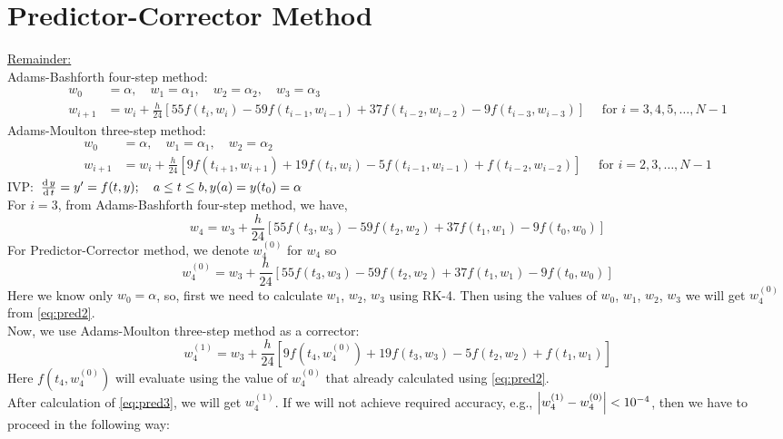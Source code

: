 \documentclass[../main-sheet.tex]{subfiles}
\begin{document}
\section{Predictor-Corrector Method}
\underline{Remainder:}\\
Adams-Bashforth four-step method:
\begin{align*}
    w_0&=\alpha, \quad w_1=\alpha_1,\quad w_2=\alpha_2,\quad w_3=\alpha_3\\
    w_{i+1}&=w_i+\frac{h}{24}\left[ 55f(t_i,w_i)-59f(t_{i-1},w_{i-1})+37f(t_{i-2},w_{i-2})-9f(t_{i-3},w_{i-3}) \right]\quad\text{ for } i=3,4,5,\dots, N-1
\end{align*}
Adams-Moulton three-step method:
\begin{align*}
    w_0&=\alpha, \quad w_1=\alpha_1,\quad w_2=\alpha_2\\
    w_{i+1}&=w_i+\frac{h}{24}\left[ 9f(t_{i+1},w_{i+1})+19f(t_{i},w_{i})-5f(t_{i-1},w_{i-1})+f(t_{i-2},w_{i-2}) \right]\quad\text{ for } i=2,3,\dots, N-1
\end{align*}
IVP: \(\,\frac{\mathrm{d}\,y}{\mathrm{d}\,t}=y'=f(t,y);\quad a\leq t\leq b, y(a)=y(t_0)=\alpha\)\\
For \(i=3\), from Adams-Bashforth four-step method, we have,
\begin{equation}
    w_{4}=w_3+\frac{h}{24}\left[ 55f(t_3,w_3)-59f(t_{2},w_{2})+37f(t_{1},w_{1})-9f(t_{0},w_{0}) \right]\label{eq:pred1}
\end{equation}
For Predictor-Corrector method, we denote \(w_4^{(0)}\) for \(w_4\) so 
\begin{equation}
    w_{4}^{(0)}=w_3+\frac{h}{24}\left[ 55f(t_3,w_3)-59f(t_{2},w_{2})+37f(t_{1},w_{1})-9f(t_{0},w_{0}) \right]\label{eq:pred2}
\end{equation}
Here we know only \(w_0=\alpha\), so, first we need to calculate \(w_1\), \(w_2\), \(w_3\) using RK-4. Then using the values of \(w_0\), \(w_1\), \(w_2\), \(w_3\) we will get \(w_4^{(0)}\) from \eqref{eq:pred2}.\\
Now, we use Adams-Moulton three-step method as a corrector:
\begin{equation}
    w_{4}^{(1)}=w_3+\frac{h}{24}\left[ 9f(t_{4},w_{4}^{(0)})+19f(t_{3},w_{3})-5f(t_{2},w_{2})+f(t_{1},w_{1}) \right]\label{eq:pred3}
\end{equation}
Here \(f(t_4,w_4^{(0)})\) will evaluate using the value of \(w_4^{(0)}\) that already calculated using \eqref{eq:pred2}.\\
After calculation of \eqref{eq:pred3}, we will get \(w_4^{(1)}\). If we will not achieve required accuracy, e.g., \(\left\vert w_4^{(1)}-w_4^{(0)}\right\vert<10^{-4}\), then we have to proceed in the following way:
\end{document}
